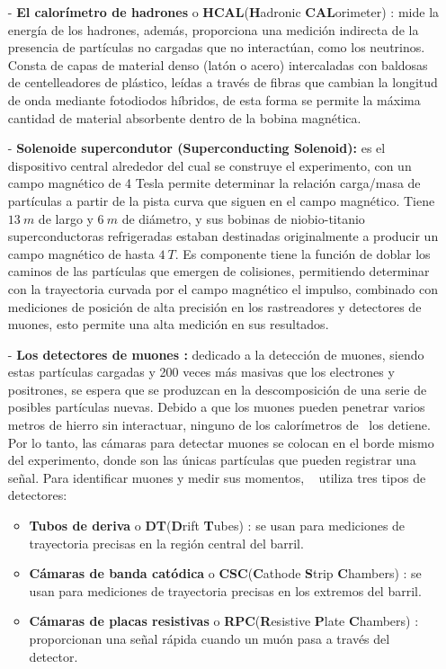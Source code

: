 \begin{itemize}
\item[-] \textbf{El calorímetro de hadrones} o \textbf{HCAL}(\textbf{H}adronic \textbf{CAL}orimeter) : mide la energía de los hadrones, además, proporciona una medición indirecta de la presencia de partículas no cargadas que no interactúan, como los neutrinos. Consta de capas de material denso (latón o acero) intercaladas con baldosas de centelleadores de plástico, leídas a través de fibras que cambian la longitud de onda mediante fotodiodos híbridos, de esta forma se permite la máxima cantidad de material absorbente dentro de la bobina magnética.

\item[-] \textbf{Solenoide supercondutor (Superconducting Solenoid):} es el dispositivo central alrededor del cual se construye el experimento, con un campo magnético de 4 Tesla permite determinar la relación carga/masa de partículas a partir de la pista curva que siguen en el campo magnético. Tiene $13~m$ de largo y $6~m$ de diámetro, y sus bobinas de niobio-titanio superconductoras refrigeradas estaban destinadas originalmente a producir un campo magnético de hasta $4~T$. Es componente tiene la función de doblar los caminos de las partículas que emergen de colisiones, permitiendo determinar con la trayectoria curvada por el campo magnético el impulso, combinado con mediciones de posición de alta precisión en los rastreadores y detectores de muones, esto permite una alta medición en sus resultados.

\item[-] \textbf{Los detectores de muones :} dedicado a la detección de muones, siendo estas partículas cargadas y 200 veces más masivas que los electrones y positrones, se espera que se produzcan en la descomposición de una serie de posibles partículas nuevas. Debido a que los muones pueden penetrar varios metros de hierro sin interactuar, ninguno de los calorímetros de \CMS ~los detiene. Por lo tanto, las cámaras para detectar muones se colocan en el borde mismo del experimento, donde son las únicas partículas que pueden registrar una señal. Para identificar muones y medir sus momentos, \CMS ~ utiliza tres tipos de detectores: 
\begin{itemize}
\item \textbf{Tubos de deriva} o \textbf{DT}(\textbf{D}rift \textbf{T}ubes) : se usan para mediciones de trayectoria precisas en la región central del barril.
\item \textbf{Cámaras de banda catódica} o \textbf{CSC}(\textbf{C}athode \textbf{S}trip \textbf{C}hambers) : se usan para mediciones de trayectoria precisas en los extremos del barril. 
\item \textbf{Cámaras de placas resistivas} o \textbf{RPC}(\textbf{R}esistive \textbf{P}late \textbf{C}hambers) : proporcionan una señal rápida cuando un muón pasa a través del detector.
\end{itemize}

\end{itemize}

